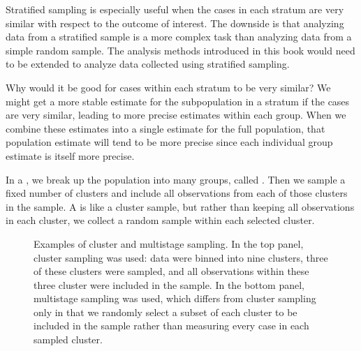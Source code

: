 Stratified sampling is especially useful when the cases in each stratum are very similar with respect to the outcome of interest. The downside is that analyzing data from a stratified sample is a more complex task than analyzing data from a simple random sample. The analysis methods introduced in this book would need to be extended to analyze data collected using stratified sampling.

\begin{examplewrap}
\begin{nexample}{Why would it be good for cases within
    each stratum to be very similar?}
  We might get a more stable estimate for the subpopulation
  in a stratum if the cases are very similar,
  leading to more precise estimates within each group.
  When we combine these estimates into a single estimate
  for the full population, that population estimate will
  tend to be more precise since each individual group
  estimate is itself more precise.
\end{nexample}
\end{examplewrap}

In a , we break up the population into many groups, called . Then we sample a fixed number of clusters and include all observations from each of those clusters in the sample. A  is like a cluster sample, but rather than keeping all observations in each cluster, we collect a random sample within each selected cluster. %

\begin{figure}
  \centering
  \caption{Examples of cluster
  and multistage sampling.
  In the top panel, cluster sampling was used:
  data were binned into nine clusters, three of these clusters
  were sampled, and all observations within these three cluster
  were included in the sample.
  In the bottom panel, multistage sampling was used,
  which differs from cluster sampling only in that we
  randomly select a subset of each cluster to be included
  in the sample rather than measuring every case in each
  sampled cluster.}
\label{cluster_multistage}
\end{figure}


